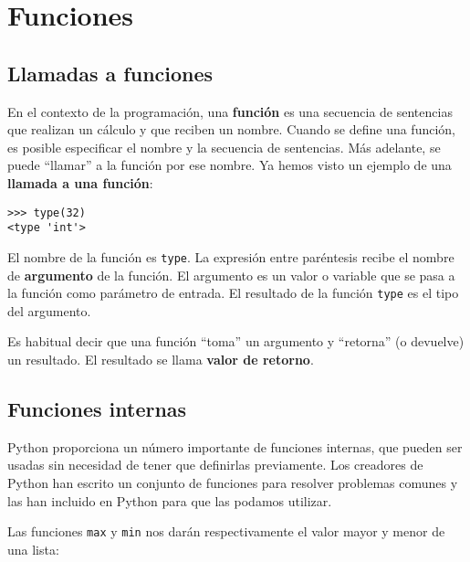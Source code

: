
\chapter{Funciones}
\label{funcchap}

\section{Llamadas a funciones}
\label{functionchap}

En el contexto de la programación, una {\bf función} es una secuencia de
sentencias que realizan un cálculo y que reciben un nombre. Cuando se define una función,
es posible especificar el nombre y la secuencia de sentencias. Más adelante, se puede
``llamar'' a la función por ese nombre.
Ya hemos visto un ejemplo de una {\bf llamada a una función}:

\beforeverb
\begin{verbatim}
>>> type(32)
<type 'int'>
\end{verbatim}
\afterverb
%
El nombre de la función es {\tt type}. La expresión entre paréntesis recibe
el nombre de {\bf argumento} de la función. El argumento es
un valor o variable que se pasa a la función como parámetro de entrada.
El resultado de la función {\tt type} es el tipo del argumento.


Es habitual decir que una función ``toma'' un argumento y ``retorna'' (o devuelve)
un resultado. El resultado se llama {\bf valor de retorno}.


\section{Funciones internas}

Python proporciona un número importante de funciones internas, que
pueden ser usadas sin necesidad de tener que definirlas previamente.
Los creadores de Python han escrito un conjunto de funciones
para resolver problemas comunes y las han incluido en Python para que las podamos utilizar.

Las funciones {\tt max} y {\tt min} nos darán respectivamente
el valor mayor y menor de una lista:

